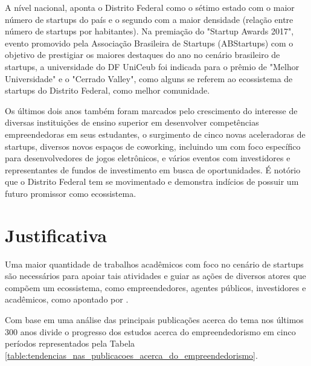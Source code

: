 A nível nacional,  aponta o Distrito Federal como o sétimo estado com o maior número de startups do país e o segundo com a maior densidade (relação entre número de startups por habitantes). Na premiação do "Startup Awards 2017", evento promovido pela Associação Brasileira de Startups (ABStartups) com o objetivo de prestigiar os maiores destaques do ano no cenário brasileiro de startups, a universidade do DF UniCeub foi indicada para o prêmio de "Melhor Universidade" e o "Cerrado Valley", como alguns se referem ao ecossistema de startups do Distrito Federal, como melhor comunidade. 

Os últimos dois anos também foram marcados pelo crescimento do interesse de diversas instituições de ensino superior em desenvolver competências empreendedoras em seus estudantes, o surgimento de cinco novas aceleradoras de startups, diversos novos espaços de coworking, incluindo um com foco específico para desenvolvedores de jogos eletrônicos, e vários eventos com investidores e representantes de fundos de investimento em busca de oportunidades. É notório que o Distrito Federal tem se movimentado e demonstra indícios de possuir um futuro promissor como ecossistema.

\section{Justificativa}
\label{section:justificativa}

Uma maior quantidade de trabalhos acadêmicos com foco no cenário de startups são necessários para apoiar tais atividades e guiar as ações de diversos atores que compõem um ecossistema, como empreendedores, agentes públicos, investidores e acadêmicos, como apontado por .

Com base em uma análise das principais publicações acerca do tema nos últimos 300 anos  divide o progresso dos estudos acerca do empreendedorismo em cinco períodos representados pela Tabela \ref{table:tendencias_nas_publicacoes_acerca_do_empreendedorismo}.

